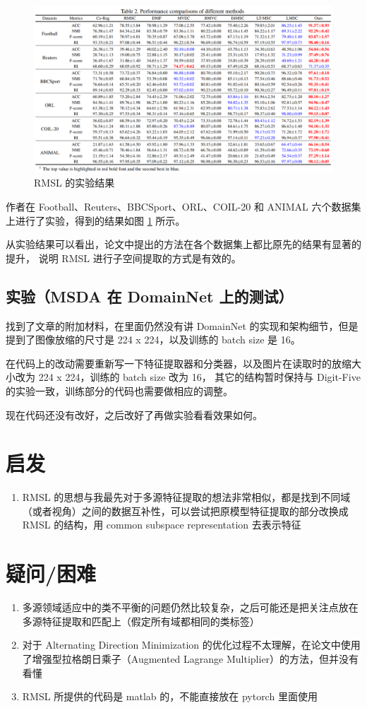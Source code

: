 \documentclass[UTF8]{ctexart}
\begin{document}
\begin{figure}[ht]
    \centering
    \includegraphics[scale=0.32]{Week09_RMSL_test.png}
    \caption{RMSL 的实验结果}
    \label{fig:RMSLtest}
\end{figure}

作者在 Football、Reuters、BBCSport、ORL、COIL-20 和 ANIMAL 六个数据集上进行了实验，得到的结果如图 \ref{fig:RMSLtest} 所示。

从实验结果可以看出，论文中提出的方法在各个数据集上都比原先的结果有显著的提升，
说明 RMSL 进行子空间提取的方式是有效的。

\subsection{实验（MSDA 在 DomainNet 上的测试）}

找到了文章的附加材料，在里面仍然没有讲 DomainNet 的实现和架构细节，但是提到了图像放缩的尺寸是 224 x 224，以及训练的 batch size 是 16。

在代码上的改动需要重新写一下特征提取器和分类器，以及图片在读取时的放缩大小改为 224 x 224，训练的 batch size 改为 16，
其它的结构暂时保持与 Digit-Five 的实验一致，训练部分的代码也需要做相应的调整。

现在代码还没有改好，之后改好了再做实验看看效果如何。

\section{启发}
\begin{enumerate}
    \item RMSL 的思想与我最先对于多源特征提取的想法非常相似，都是找到不同域（或者视角）之间的数据互补性，可以尝试把原模型特征提取的部分改换成 RMSL 的结构，用 common subspace representation 去表示特征
\end{enumerate}
\section{疑问/困难}
\begin{enumerate}
    \item 多源领域适应中的类不平衡的问题仍然比较复杂，之后可能还是把关注点放在多源特征提取和匹配上（假定所有域都相同的类标签）
    \item 对于 Alternating Direction Minimization 的优化过程不太理解，在论文中使用了增强型拉格朗日乘子（Augmented Lagrange Multiplier）的方法，但并没有看懂
    \item RMSL 所提供的代码是 matlab 的，不能直接放在 pytorch 里面使用
\end{enumerate}
\end{document}
